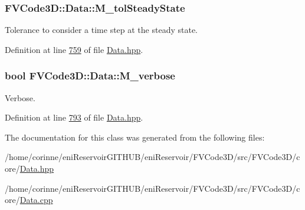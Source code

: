 \subsubsection[{\texorpdfstring{M\+\_\+tol\+Steady\+State}{M_tolSteadyState}}]{ F\+V\+Code3\+D\+::\+Data\+::\+M\+\_\+tol\+Steady\+State\hspace{0.3cm}{\ttfamily [protected]}}\hypertarget{classFVCode3D_1_1Data_a985779d5af3b0a0cdee095d599f4edc5}{}\label{classFVCode3D_1_1Data_a985779d5af3b0a0cdee095d599f4edc5}


Tolerance to consider a time step at the steady state. 



Definition at line \hyperlink{Data_8hpp_source_l00759}{759} of file \hyperlink{Data_8hpp_source}{Data.\+hpp}.

\subsubsection[{\texorpdfstring{M\+\_\+verbose}{M_verbose}}]{\setlength{\rightskip}{0pt plus 5cm}bool F\+V\+Code3\+D\+::\+Data\+::\+M\+\_\+verbose\hspace{0.3cm}{\ttfamily [protected]}}\hypertarget{classFVCode3D_1_1Data_abce1861779ec036fc587fb69a7fe8c6c}{}\label{classFVCode3D_1_1Data_abce1861779ec036fc587fb69a7fe8c6c}


Verbose. 



Definition at line \hyperlink{Data_8hpp_source_l00793}{793} of file \hyperlink{Data_8hpp_source}{Data.\+hpp}.



The documentation for this class was generated from the following files\+:\begin{DoxyCompactItemize}
\item 
/home/corinne/eni\+Reservoir\+G\+I\+T\+H\+U\+B/eni\+Reservoir/\+F\+V\+Code3\+D/src/\+F\+V\+Code3\+D/core/\hyperlink{Data_8hpp}{Data.\+hpp}\item 
/home/corinne/eni\+Reservoir\+G\+I\+T\+H\+U\+B/eni\+Reservoir/\+F\+V\+Code3\+D/src/\+F\+V\+Code3\+D/core/\hyperlink{Data_8cpp}{Data.\+cpp}\end{DoxyCompactItemize}
